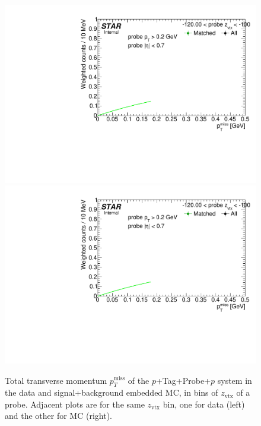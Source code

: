 


\begin{figure}[h!]
\caption[Tag\&Probe fits to $p_{T}^{\text{miss}}$ in bins of probe $z_{\text{vtx}}$.]{Total transverse momentum $p_{T}^{\text{miss}}$ of the $p$+Tag+Probe+$p$ system in the data and signal+background embedded MC, in bins of $z_{\text{vtx}}$ of a probe. Adjacent plots are for the same $z_{\text{vtx}}$ bin, one for data (left) and the other for MC (right).}\label{fig:tagAndProbeTofEffFits_ZVtx}
\centering
\parbox{0.24\textwidth}{  
  \centering
  \includegraphics[width=\linewidth,page=3]{graphics/correctionsToEff/TOF_tagAndProbe/Fitting_effVsZVtx_data.CPT2.pdf}\\
  \includegraphics[width=\linewidth,page=5]{graphics/correctionsToEff/TOF_tagAndProbe/Fitting_effVsZVtx_data.CPT2.pdf}\\
}
\end{figure}
